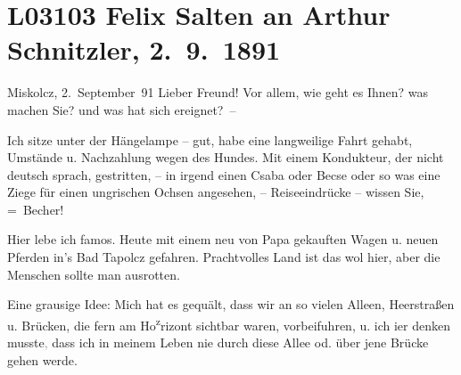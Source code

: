

\section[Felix Salten an Arthur Schnitzler, 2. 9. 1891]{L03103 Felix Salten an Arthur Schnitzler, 2. 9. 1891}
\nopagebreak{}
\rehead{ }\normalsize\beginnumbering{}
\toendnotes[C]{\smallbreak\pagebreak[2]}
\toendnotes[C]{\smallbreak}
\pstart
           \raggedleft{}{\pb}Miskolcz, 2. September 91\pend
           \vspace{0.5em}
\pstart
           Lieber Freund! Vor allem, wie geht es Ihnen? was
               machen Sie? und was hat sich ereignet? –\pend
           
\pstart
           Ich sitze unter der Hängelampe – gut, habe eine langweilige Fahrt gehabt, Umstände u.
               Nachzahlung wegen des Hundes. Mit einem Kondukteur, der nicht deutsch sprach,
               gestritten, – in irgend einen Csaba oder Becse oder so was eine Ziege für einen
               ungrischen Ochsen angesehen, – Reiseeindrücke – wissen Sie, = Becher!\pend
           
\pstart
           {\pb}Hier lebe ich famos. Heute mit einem neu von Papa gekauften Wagen u. neuen Pferden in’s
                  Bad Tapolcz gefahren. Prachtvolles Land ist das wol hier, aber
               die Menschen sollte man ausrotten.\pend
           
\pstart
           Eine grausige Idee: Mich hat es gequält, dass wir an so vielen Alleen, Heerstraßen u.
               Brücken,  die fern am Ho\substVorne{}\textsuperscript{z}\substDazwischen{}r\substHinten{}izont sichtbar waren, vorbeifuhren, u. ich i{\geminationm}er
               denken musste\textcolor{gray}{,} dass ich in meinem Leben nie durch diese Allee od.
               über jene Brücke gehen werde.\pend
           

